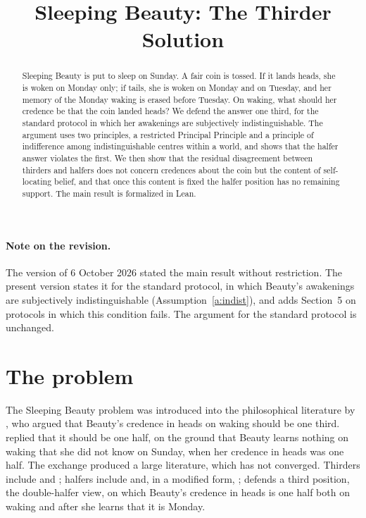\documentclass{situationist-preprint}
\title{Sleeping Beauty: The Thirder Solution}
\begin{document}
\maketitle

\begin{abstract}
Sleeping Beauty is put to sleep on Sunday. A fair coin is tossed. If it lands heads, she is woken on Monday only; if tails, she is woken on Monday and on Tuesday, and her memory of the Monday waking is erased before Tuesday. On waking, what should her credence be that the coin landed heads? We defend the answer one third, for the standard protocol in which her awakenings are subjectively indistinguishable. The argument uses two principles, a restricted Principal Principle and a principle of indifference among indistinguishable centres within a world, and shows that the halfer answer violates the first. We then show that the residual disagreement between thirders and halfers does not concern credences about the coin but the content of self-locating belief, and that once this content is fixed the halfer position has no remaining support. The main result is formalized in Lean.
\end{abstract}

\paragraph{Note on the revision.} The version of 6 October 2026 stated the main result without restriction. The present version states it for the standard protocol, in which Beauty's awakenings are subjectively indistinguishable (Assumption~\ref{a:indist}), and adds Section~5 on protocols in which this condition fails. The argument for the standard protocol is unchanged.

\section{The problem}

The Sleeping Beauty problem was introduced into the philosophical literature by \citet{Elga2000}, who argued that Beauty's credence in heads on waking should be one third. \citet{Lewis2001} replied that it should be one half, on the ground that Beauty learns nothing on waking that she did not know on Sunday, when her credence in heads was one half. The exchange produced a large literature, which has not converged. Thirders include \citet{Dorr2002} and \citet{Titelbaum2013}; halfers include \citet{Lewis2001} and, in a modified form, \citet{Bostrom2007}; \citet{Meacham2008} defends a third position, the double-halfer view, on which Beauty's credence in heads is one half both on waking and after she learns that it is Monday.
\end{document}
